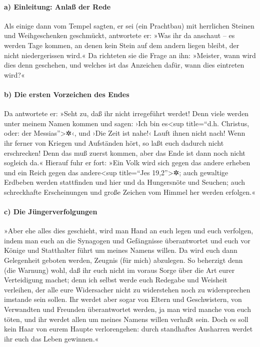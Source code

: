 \hypertarget{a-einleitung-anlauxdf-der-rede}{%
\paragraph{a) Einleitung: Anlaß der
Rede}\label{a-einleitung-anlauxdf-der-rede}}

 Als einige dann vom Tempel sagten, er sei (ein Prachtbau)
mit herrlichen Steinen und Weihgeschenken geschmückt, antwortete er:
 »Was ihr da anschaut -- es werden Tage kommen, an denen
kein Stein auf dem andern liegen bleibt, der nicht niedergerissen wird.«
 Da richteten sie die Frage an ihn: »Meister, wann wird
dies denn geschehen, und welches ist das Anzeichen dafür, wann dies
eintreten wird?«

\hypertarget{b-die-ersten-vorzeichen-des-endes}{%
\paragraph{b) Die ersten Vorzeichen des
Endes}\label{b-die-ersten-vorzeichen-des-endes}}

 Da antwortete er: »Seht zu, daß ihr nicht irregeführt
werdet! Denn viele werden unter meinem Namen kommen und sagen: ›Ich bin
es\textless sup title=``d.h. Christus, oder: der
Messias''\textgreater✲‹, und ›Die Zeit ist nahe!‹ Lauft ihnen nicht
nach!  Wenn ihr ferner von Kriegen und Aufständen hört, so
laßt euch dadurch nicht erschrecken! Denn das muß zuerst kommen, aber
das Ende ist dann noch nicht sogleich da.«  Hierauf fuhr
er fort: »Ein Volk wird sich gegen das andere erheben und ein Reich
gegen das andere\textless sup title=``Jes 19,2''\textgreater✲;
 auch gewaltige Erdbeben werden stattfinden und hier und
da Hungersnöte und Seuchen; auch schreckhafte Erscheinungen und große
Zeichen vom Himmel her werden erfolgen.«

\hypertarget{c-die-juxfcngerverfolgungen}{%
\paragraph{c) Die
Jüngerverfolgungen}\label{c-die-juxfcngerverfolgungen}}

 »Aber ehe alles dies geschieht, wird man Hand an euch
legen und euch verfolgen, indem man euch an die Synagogen und
Gefängnisse überantwortet und euch vor Könige und Statthalter führt um
meines Namens willen.  Da wird euch dann Gelegenheit
geboten werden, Zeugnis (für mich) abzulegen.  So
beherzigt denn (die Warnung) wohl, daß ihr euch nicht im voraus Sorge
über die Art eurer Verteidigung machet;  denn ich selbst
werde euch Redegabe und Weisheit verleihen, der alle eure Widersacher
nicht zu widerstehen noch zu widersprechen imstande sein sollen.
 Ihr werdet aber sogar von Eltern und Geschwistern, von
Verwandten und Freunden überantwortet werden, ja man wird manche von
euch töten,  und ihr werdet allen um meines Namens willen
verhaßt sein.  Doch es soll kein Haar von eurem Haupte
verlorengehen:  durch standhaftes Ausharren werdet ihr
euch das Leben gewinnen.«

